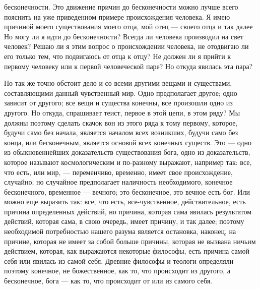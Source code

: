 \documentclass[12pt]{article}
\begin{document}
бесконечности. Это движение причин до бесконечности можно лучше всего пояснить на уже приведенном примере происхождения человека. Я имею причиной моего существования моего отца, мой отец --- своего отца и так далее Но могу ли я идти до бесконечности? Всегда ли человека производил на свет человек? Решаю ли я этим вопрос о происхождении человека, не отодвигаю ли его только тем, что подвигаюсь от отца к отцу? Не должен ли я прийти к первому человеку или к первой человеческой паре? Но откуда явилась эта пара? 

Но так же точно обстоит дело и со всеми другими вещами и существами, составляющими данный чувственный мир. Одно предполагает другое; одно зависит от другого; все вещи и существа конечны, все произошли одно из другого. Но откуда, спрашивает теист, первое в этой цепи, в этом ряду? Мы должны поэтому сделать скачок вон из этого ряда к тому первому, которое, будучи само без начала, является началом всех возникших, будучи само без конца, или бесконечным, является основой всех конечных существ. Это --- одно из обыкновеннейших доказательств существования бога, одно из доказательств, которое называют космологическим и по-разному выражают, например так: все, что есть, или мир, --- переменчиво, временно, имеет свое происхождение, случайно; но случайное предполагает наличность необходимого, конечное бесконечного, временное --- вечного; это бесконечное, это вечное есть бог. Или можно еще выразить так: все, что есть, все-чувственное, действительное, есть причина определенных действий, но причина, которая сама явилась результатом действий, которая сама, в свою очередь, имеет причину, и так далее; поэтому необходимой потребностью нашего разума является остановка, наконец, на причине, которая не имеет за собой больше причины, которая не вызвана ничьим действием, которая, как выражаются некоторые философы, есть причина самой себя или явилась из самой себя. Древние философы и теологи определяли поэтому конечное, не божественное, как то, что происходит из другого, а бесконечное, бога --- как то, что происходит от или из самого себя. 
\end{document}
